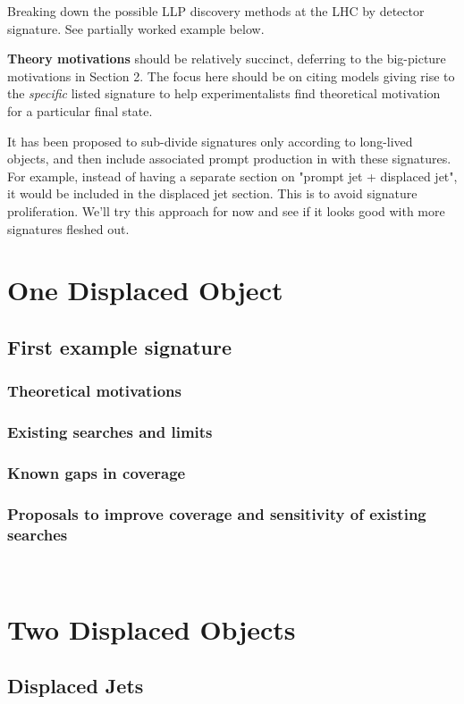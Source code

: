 Breaking down the possible LLP discovery methods at the LHC by detector signature. See partially worked example below.

{\bf Theory motivations} should be relatively succinct, deferring to the big-picture motivations in Section 2. The focus here should be on citing models giving rise to the \emph{specific} listed signature to help experimentalists find theoretical motivation for a particular final state.

It has been proposed to sub-divide signatures only according to long-lived objects, and then include associated prompt production in with these signatures. For example, instead of having a separate section on "prompt jet + displaced jet", it would be included in the displaced jet section. This is to avoid signature proliferation. We'll try this approach for now and see if it looks good with more signatures fleshed out.

\section{One Displaced Object}

\subsection{First example signature}
\subsubsection{Theoretical motivations}
\subsubsection{Existing searches and limits}
\subsubsection{Known gaps in coverage}
\subsubsection{Proposals to improve coverage and sensitivity of existing searches}
$\;$ \newline $\;$

\section{Two Displaced Objects}

\subsection{Displaced Jets}

